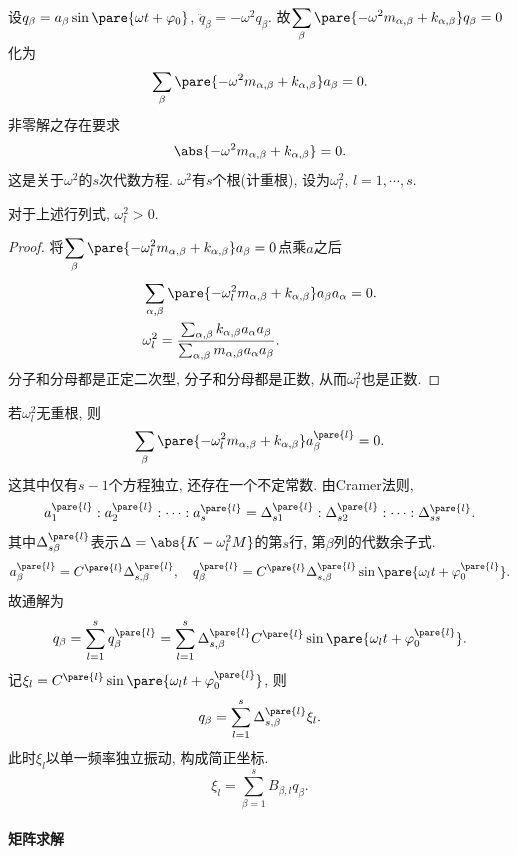 \documentclass[../LectureNotes.tex]{subfiles}
\begin{document}
设$q_\beta = a_\beta \sin\pare{\omega t + \varphi_0}$, $\ddot{q}_\beta = -\omega^2 q_\beta$. 故$\displaystyle \sum_\beta \pare{-\omega^2 m_{\alpha,\beta} + k_{\alpha,\beta}}q_\beta = 0$化为
\[ \sum_\beta \pare{-\omega^2 m_{\alpha,\beta} + k_{\alpha,\beta}} a_\beta = 0. \]
非零解之存在要求
\[ \abs{-\omega^2 m_{\alpha,\beta} + k_{\alpha,\beta}} = 0. \]
这是关于$\omega^2$的$s$次代数方程. $\omega^2$有$s$个根(计重根), 设为$\omega_l^2$, $l=1,\cdots, s$.
\begin{lemma}
    对于上述行列式, $\omega_l^2 > 0$.
\end{lemma}
\begin{proof}
    将$\displaystyle \sum_\beta \pare{-\omega_l^2 m_{\alpha,\beta} + k_{\alpha,\beta}} a_\beta = 0$点乘$a$之后
    \begin{align*}
        & \sum_{\alpha,\beta} \pare{-\omega_l^2 m_{\alpha,\beta} + k_{\alpha,\beta}}a_\beta a_\alpha = 0. \\
        & \omega_l^2 = \frac{\sum_{\alpha,\beta} k_{\alpha,\beta} a_\alpha a_\beta}{\sum_{\alpha,\beta} m_{\alpha,\beta} a_\alpha a_\beta}.
    \end{align*}
    分子和分母都是正定二次型, 分子和分母都是正数, 从而$\omega_l^2$也是正数.
\end{proof}
若$\omega_l^2$无重根, 则
\[ \sum_\beta \pare{-\omega_l^2 m_{\alpha,\beta} + k_{\alpha,\beta}} a_\beta^{\pare{l}} = 0. \]
这其中仅有$s-1$个方程独立, 还存在一个不定常数. 由Cramer法则,
\[ a_1^{\pare{l}} : a_2^{\pare{l}} : \cdots : a_s^{\pare{l}} = \Delta_{s1}^{\pare{l}} : \Delta_{s2}^{\pare{l}} : \cdots : \Delta_{ss}^{\pare{l}}. \]
其中$\Delta_{s\beta}^{\pare{l}}$表示$\Delta = \abs{K - \omega_l^2 M}$的第$s$行, 第$\beta$列的代数余子式.
\[ a_\beta^{\pare{l}} = C^{\pare{l}} \Delta_{s,\beta}^{\pare{l}},\quad q_\beta^{\pare{l}} = C^{\pare{l}} \Delta_{s,\beta}^{\pare{l}} \sin\pare{\omega_l t + \varphi_0^{\pare{l}}}. \]
故通解为
\[ q_\beta = \sum_{l=1}^s q_\beta^{\pare{l}} = \sum_{l=1}^s \Delta_{s,\beta}^{\pare{l}} C^{\pare{l}} \sin\pare{\omega_l t + \varphi_0^{\pare{l}}}. \]
记$\xi_l = C^{\pare{l}} \sin\pare{\omega_l t + \varphi_0^{\pare{l}}}$, 则
\[ q_\beta = \sum_{l=1}^s \Delta_{s,\beta}^{\pare{l}} \xi_l. \]
此时$\xi_l$以单一频率独立振动, 构成简正坐标.
\[ \xi_l = \sum_{\beta = 1}^s B_{\beta, l}q_\beta. \]


\paragraph{矩阵求解} %
\label{par:矩阵求解}
\end{document}
